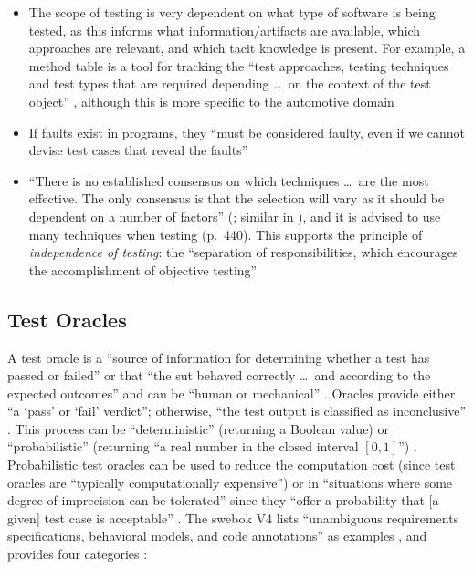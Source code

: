 \begin{itemize}
    \item The scope of testing is very dependent on what type of software
          is being tested, as this informs what information/artifacts are
          available, which approaches are relevant, and which tacit knowledge
          is present. For example, a method table
          is a tool for tracking the ``test approaches, testing techniques
          and test types that are required depending \dots\ on the context of
          the test object'' \citepISTQB{} , although
          this is more specific to the automotive domain
    \item If faults exist in programs, they ``must be considered faulty, even
          if we cannot devise test cases that reveal the faults''
          \citep[p.~401]{vanVliet2000}
    \item ``There is no established consensus on which techniques \dots\ are
          the most effective. The only consensus is that the selection will
          vary as it should be dependent on a number of factors''
          (\citealp[p.~128]{IEEE2021c}; similar in
          \citealp[p.~440]{vanVliet2000}), and it is advised to
          use many techniques when testing (p.~440).
          This supports the principle of \emph{independence of testing}: the
          ``separation of responsibilities, which encourages the
          accomplishment of objective testing'' \citepISTQB{}
\end{itemize}

\subsection{Test Oracles}
A test oracle is a ``source of information for determining whether a test has
passed or failed'' \citep[p.~13]{IEEE2022} or that ``the \acs{sut} behaved
correctly \dots\ and according to the expected outcomes'' and can be ``human or
mechanical'' \citep[p.~5-5]{SWEBOK2024}. Oracles provide either ``a
`pass' or `fail' verdict''; otherwise, ``the test output is classified as
inconclusive'' \citep[p.~5-5]{SWEBOK2024}. This process can be ``deterministic''
(returning a Boolean value) or ``probabilistic'' (returning ``a real number in
the closed interval $[0, 1]$'') \citep[p.~509]{BarrEtAl2015}. Probabilistic
test oracles can be used to reduce the computation cost (since test oracles
are ``typically computationally expensive'') \citep[p.~509]{BarrEtAl2015}
or in ``situations where some degree of imprecision can be tolerated'' since
they ``offer a probability that [a given] test case is acceptable''
\citep[p.~510]{BarrEtAl2015}. The \acs{swebok} V4 lists ``unambiguous requirements
specifications, behavioral models, and code annotations'' as examples
\citep[p.~5-5]{SWEBOK2024}, and \citeauthor{BarrEtAl2015} provides four
categories \citeyearpar[p.~510]{BarrEtAl2015}:

